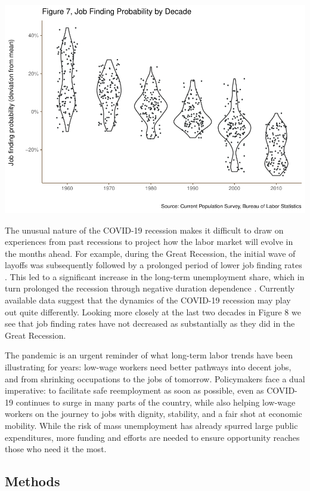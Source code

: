 \documentclass[
  11pt,
]{article}
\begin{document}
\begin{center}\includegraphics{JOLTS_files/figure-latex/unnamed-chunk-11-1} \end{center}

The unusual nature of the COVID-19 recession makes it difficult to draw
on experiences from past recessions to project how the labor market will
evolve in the months ahead. For example, during the Great Recession, the
initial wave of layoffs was subsequently followed by a prolonged period
of lower job finding rates \citep{elsby09}. This led to a significant
increase in the long-term unemployment share, which in turn prolonged
the recession through negative duration dependence \citep{krueger14}.
Currently available data suggest that the dynamics of the COVID-19
recession may play out quite differently. Looking more closely at the
last two decades in Figure 8 we see that job finding rates have not
decreased as substantially as they did in the Great Recession.

The pandemic is an urgent reminder of what long-term labor trends have
been illustrating for years: low-wage workers need better pathways into
decent jobs, and from shrinking occupations to the jobs of tomorrow.
Policymakers face a dual imperative: to facilitate safe reemployment as
soon as possible, even as COVID-19 continues to surge in many parts of
the country, while also helping low-wage workers on the journey to jobs
with dignity, stability, and a fair shot at economic mobility. While the
risk of mass unemployment has already spurred large public expenditures,
more funding and efforts are needed to ensure opportunity reaches those
who need it the most.

\hypertarget{methods}{%
\subsection{Methods}\label{methods}}
\end{document}
